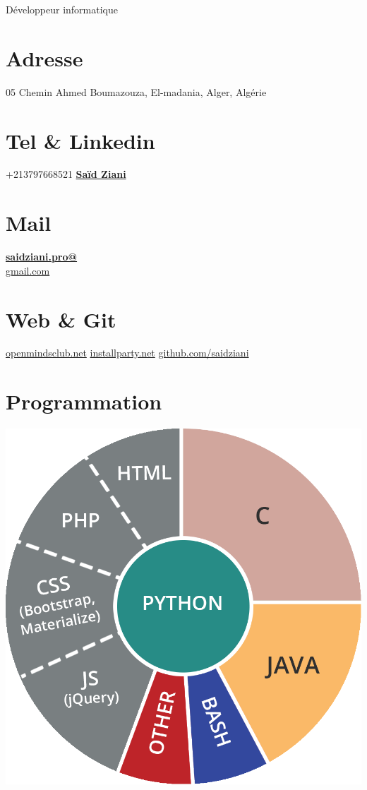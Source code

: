 \documentclass[]{friggeri-cv}
\begin{document}
      {Développeur informatique}
      

\begin{aside}
  \section{Adresse}
    05 Chemin Ahmed Boumazouza,
    El-madania, Alger, Algérie
    ~
    ~
  \section{Tel \& Linkedin}
    +213797668521
    \href{https://www.linkedin.com/in/sa%C3%AFd-ziani-008487120/}{\textbf{Saïd Ziani}}
    ~
    ~
  \section{Mail}
    \href{mailto:saidziani.pro@gmail.com}{\textbf{saidziani.pro@}\\gmail.com}
    ~
    ~
  \section{Web \& Git}
    \href{http://www.openmindsclub.net}{openmindsclub.net}
    \href{http://www.openmindsclub.net/ip8}{installparty.net}
    \href{https://github.com/saidziani}{github.com/saidziani}
    ~
    ~
  \section{Programmation}
    \includegraphics[scale=0.1]{img/programmation.png}
    ~
    ~

\end{aside}
\end{document}
